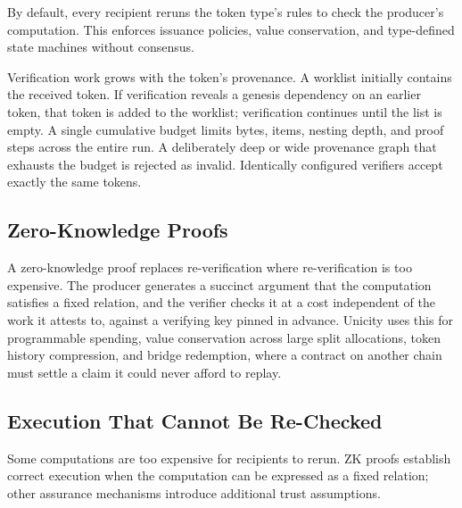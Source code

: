 By default, every recipient reruns the token type's rules to check the producer's computation. This enforces issuance policies, value conservation, and type-defined state machines without consensus.

Verification work grows with the token's provenance. A worklist initially contains the received token. If verification reveals a genesis dependency on an earlier token, that token is added to the worklist; verification continues until the list is empty. A single cumulative budget limits bytes, items, nesting depth, and proof steps across the entire run. A deliberately deep or wide provenance graph that exhausts the budget is rejected as invalid. Identically configured verifiers accept exactly the same tokens.

\subsection{Zero-Knowledge Proofs}

A zero-knowledge proof replaces re-verification where re-verification is too expensive. The producer generates a succinct argument that the computation satisfies a fixed relation, and the verifier checks it at a cost independent of the work it attests to, against a verifying key pinned in advance. Unicity uses this for programmable spending, value conservation across large split allocations, token history compression, and bridge redemption, where a contract on another chain must settle a claim it could never afford to replay.

\subsection{Execution That Cannot Be Re-Checked}

Some computations are too expensive for recipients to rerun. ZK proofs establish correct execution when the computation can be expressed as a fixed relation; other assurance mechanisms introduce additional trust assumptions.

